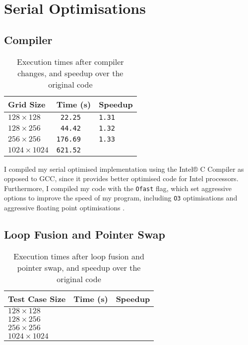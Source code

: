 \documentclass[11pt, twocolumn, a4paper]{article}
\begin{document}
\section{Serial Optimisations}

\subsection{Compiler}

\begin{table}[htbp]
  \begin{center}
  \caption{Execution times after compiler changes, and speedup over the original code}\label{tab:compiler_changes}
  \begin{tabular}{l | l l} 
      \hline\hline
      Grid Size&Time (s)&Speedup\\
      \hline
      $128 \times 128$&\texttt{ 22.25}&\texttt{1.31}\\
      $128 \times 256$&\texttt{ 44.42}&\texttt{1.32}\\
      $256 \times 256$&\texttt{176.69}&\texttt{1.33}\\
      $1024 \times 1024$&\texttt{621.52}\\
      \hline
    \end{tabular}
  \end{center}
\end{table} 

I compiled my serial optimised implementation using the Intel® C Compiler as opposed to GCC, since it provides better optimised code for Intel processors.
Furthermore, I compiled my code with the \texttt{Ofast} flag, which set aggressive options to improve the speed of my program, including \texttt{O3} optimisations and aggressive floating point optimisations \cite{icc}.

\subsection{Loop Fusion and Pointer Swap}

\begin{table}[htbp]
  \begin{center}
  \caption{Execution times after loop fusion and pointer swap, and speedup over the original code}\label{tab:loop_fusion_pointer_swap}
  \begin{tabular}{l | l l} 
      \hline\hline
      Test Case Size&Time (s)&Speedup\\
      \hline
      $128 \times 128$&\texttt{}&\texttt{}\\
      $128 \times 256$&\texttt{}&\texttt{}\\
      $256 \times 256$&\texttt{}&\texttt{}\\
      $1024 \times 1024$&\texttt{}&\texttt{}\\
      \hline
    \end{tabular}
  \end{center}
\end{table} 
\end{document}
